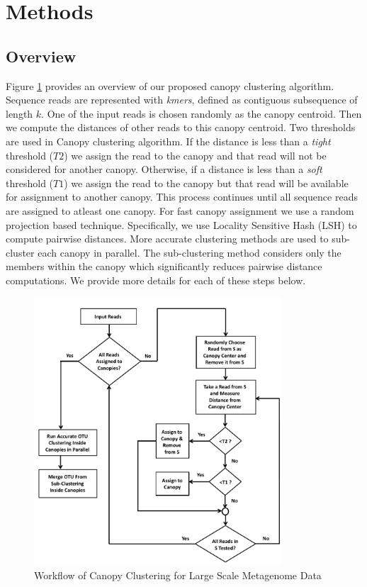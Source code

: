 \documentclass[10pt, conference, compsocconf]{IEEEtran}
\begin{document}

\section{Methods}
\label{sec:Methods}
\subsection{\textbf{Overview}}


Figure \ref{fig:flowchart} provides 
an overview of our 
proposed canopy clustering algorithm.  Sequence reads are represented with \textit{kmers}, 
defined as contiguous subsequence of 
length $k$. One of the input reads is chosen randomly 
as the canopy centroid. Then we compute the distances of other reads to 
this canopy centroid. Two thresholds are used in Canopy clustering algorithm. If the 
distance is less than a \emph{tight} threshold ($T2$) we assign the read to the canopy and that
read will not be considered for another canopy. Otherwise, if a distance is less than a \emph{soft} threshold ($T1$) we assign the 
read to the canopy but that read will be available for assignment to 
another 
canopy. This process continues until all sequence reads are
assigned to atleast one canopy. For fast canopy assignment we use a random projection based 
technique. Specifically, we use Locality Sensitive Hash (LSH) to compute pairwise distances. More accurate clustering methods are 
used to sub-cluster each canopy in parallel. The sub-clustering method considers only the members within 
the canopy which significantly 
reduces pairwise distance computations. We provide more details for each of  these steps below.

\begin{figure}
	\centering
	\includegraphics[width=\linewidth,height=10cm]{flowchart.pdf}	
	\caption{Workflow of Canopy Clustering for Large Scale Metagenome Data}
	\label{fig:flowchart}
\end{figure}
\end{document}
